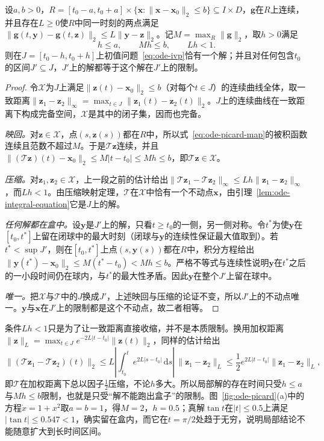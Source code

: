 \begin{theorem}[局部存在唯一性]
  \label{thm:ode-picard-lindelof}
  设$a,b>0$，$R=[t_0-a,t_0+a]\times\{\bm x:\|\bm x-\bm x_0\|_2\leq b\}\subseteq I\times D$，$\bm g$在$R$上连续，并且存在$L\geq0$使$R$中同一时刻的两点满足$\|\bm g(t,\bm y)-\bm g(t,\bm z)\|_2\leq L\|\bm y-\bm z\|_2$。记$M=\max_R\|\bm g\|_2$，取$h>0$满足
  \[
    h\leq a,\qquad Mh\leq b,\qquad Lh<1.
  \]
  则在$J=[t_0-h,t_0+h]$上初值问题~\eqref{eq:ode-ivp}恰有一个解；并且对任何包含$t_0$的区间$J'\subseteq J$，$J'$上的解都等于这个解在$J'$上的限制。
\end{theorem}

\begin{proof}
  令$\mathcal X$为$J$上满足$\|\bm z(t)-\bm x_0\|_2\leq b$（对每个$t\in J$）的连续曲线全体，取一致距离$\|\bm z_1-\bm z_2\|_\infty=\max_{t\in J}\|\bm z_1(t)-\bm z_2(t)\|_2$。$J$上的连续曲线在一致距离下构成完备空间，$\mathcal X$是其中的闭子集，因而也完备。

  \emph{映回。}对$\bm z\in\mathcal X$，点$(s,\bm z(s))$都在$R$中，所以式~\eqref{eq:ode-picard-map}的被积函数连续且范数不超过$M$。于是$\mathcal T\bm z$连续，并且$\|(\mathcal T\bm z)(t)-\bm x_0\|_2\leq M|t-t_0|\leq Mh\leq b$，即$\mathcal T\bm z\in\mathcal X$。

  \emph{压缩。}对$\bm z_1,\bm z_2\in\mathcal X$，上一段之前的估计给出$\|\mathcal T\bm z_1-\mathcal T\bm z_2\|_\infty\leq Lh\|\bm z_1-\bm z_2\|_\infty$，而$Lh<1$。由压缩映射定理，$\mathcal T$在$\mathcal X$中恰有一个不动点$\bm x$，由引理~\ref{lem:ode-integral-equation}它是$J$上的解。

  \emph{任何解都在盒中。}设$\bm y$是$J'$上的解，只看$t\geq t_0$的一侧，另一侧对称。令$t^\ast$为使$\bm y$在$[t_0,t^\ast]$上留在闭球中的最大时刻（闭球与$\bm y$的连续性保证最大值取到）。若$t^\ast<\sup J'$，则在$[t_0,t^\ast]$上点$(s,\bm y(s))$都在$R$中，积分方程给出$\|\bm y(t^\ast)-\bm x_0\|_2\leq M(t^\ast-t_0)<Mh\leq b$。严格不等式与连续性说明$\bm y$在$t^\ast$之后的一小段时间仍在球内，与$t^\ast$的最大性矛盾。因此$\bm y$在整个$J'$上留在球中。

  \emph{唯一。}把$\mathcal X$与$\mathcal T$中的$J$换成$J'$，上述映回与压缩的论证不变，所以$J'$上的不动点唯一。$\bm y$与$\bm x$在$J'$上的限制都是这个不动点，故二者相等。
\end{proof}

条件$Lh<1$只是为了让一致距离直接收缩，并不是本质限制。换用加权距离$\|\bm z\|_{L}=\max_{t\in J}e^{-2L|t-t_0|}\|\bm z(t)\|_2$，同样的估计给出
\[
  \bigl\|(\mathcal T\bm z_1-\mathcal T\bm z_2)(t)\bigr\|_2
  \leq L\left|\int_{t_0}^te^{2L|s-t_0|}\,\mathrm ds\right|\,\|\bm z_1-\bm z_2\|_{L}
  \leq\frac12e^{2L|t-t_0|}\|\bm z_1-\bm z_2\|_{L},
\]
即$\mathcal T$在加权距离下总以因子$\tfrac12$压缩，不论$h$多大。所以局部解的存在时间只受$h\leq a$与$Mh\leq b$限制，也就是只受“解不能跑出盒子”的限制。图~\ref{fig:ode-picard}(a)中的方程$\dot x=1+x^2$取$a=b=1$，得$M=2$，$h=0.5$；真解$\tan t$在$|t|\leq0.5$上满足$|\tan t|\leq0.547<1$，确实留在盒内，而它在$t=\pi/2$处趋于无穷，说明局部结论不能随意扩大到长时间区间。

